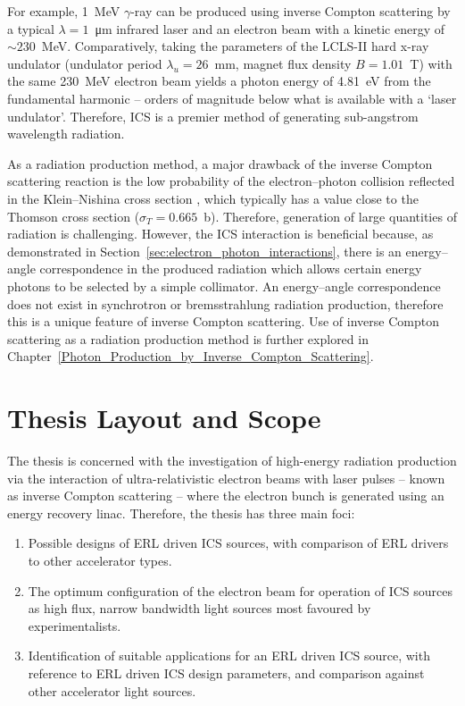 \documentclass[../main.tex]{subfiles}
\begin{document}
For example, 1~\si{\mega\electronvolt} $\gamma$-ray can be produced using inverse Compton scattering by a typical $\lambda = 1$~\si{\micro\meter} infrared laser and an electron beam with a kinetic energy of $\sim 230$~\si{\mega\electronvolt}. Comparatively, taking the parameters of the LCLS-II hard x-ray undulator
(undulator period $\lambda_{u} = 26$~\si{\milli\meter}, magnet flux density $B = 1.01$~\si{\tesla}) \cite{wallen2016status} with the same 230~\si{\mega\electronvolt} electron beam yields a photon energy of 4.81~\si{\electronvolt} from the fundamental harmonic -- orders of magnitude below what is available with a `laser undulator'. Therefore, ICS is a premier method of generating sub-angstrom wavelength radiation.

As a radiation production method, a major drawback of the inverse Compton scattering reaction is the low probability of the electron--photon collision reflected in the Klein--Nishina cross section \cite{klein1929streuung}, which typically has a value close to the Thomson cross section ($\sigma_{T} = 0.665$~\si{\barn}). Therefore, generation of large quantities of radiation is challenging. However, the ICS interaction is beneficial because, as demonstrated in Section~\ref{sec:electron_photon_interactions}, there is an energy--angle correspondence in the produced radiation which allows certain energy photons to be selected by a simple collimator. An energy--angle correspondence does not exist in synchrotron or bremsstrahlung radiation production, therefore this is a unique feature of inverse Compton scattering. Use of inverse Compton scattering as a radiation production method is further explored in Chapter~\ref{Photon_Production_by_Inverse_Compton_Scattering}. 

\section{Thesis Layout and Scope}
\label{sec:thesis_layout_scope}

The thesis is concerned with the investigation of high-energy radiation production via the interaction of ultra-relativistic electron beams with laser pulses -- known as inverse Compton scattering -- where the electron bunch is generated using an energy recovery linac. Therefore, the thesis has three main foci: 
\begin{enumerate}
    \item{Possible designs of ERL driven ICS sources, with comparison of ERL drivers to other accelerator types.}
    \item{The optimum configuration of the electron beam for operation of ICS sources as high flux, narrow bandwidth light sources most favoured by experimentalists.}
    \item{Identification of suitable applications for an ERL driven ICS source, with reference to ERL driven ICS design parameters, and comparison against other accelerator light sources.}
\end{enumerate}
\end{document}
